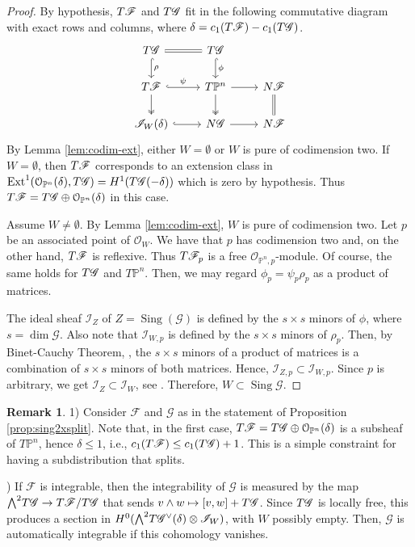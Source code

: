 \documentclass[twoside]{amsart}
\numberwithin{equation}{section}
\newcommand{\opn}{{\mathcal O}_{\mathbb{P}^{n}}}
\newcommand{\pn}{{\mathbb{P}^{n}}}
\newcommand{\tpn}{T{\mathbb{P}^{n}}}
\newcommand{\sI}{\mathscr{I}}
\DeclareMathOperator{\sing}{Sing}
\DeclareMathOperator{\Ext}{Ext}
\def\OO{\mathcal{O}}
\newcommand{\sF}{\mathscr{F}}
\newcommand{\sG}{\mathscr{G}}
\newcommand{\tF}{{\rm T}\sF}
\newcommand{\tG}{{\rm T}\sG}
\newcommand{\nF}{{\rm N}\sF}
\newcommand{\nG}{{\rm N}\sG}
\newcommand{\extp}{{\textstyle \bigwedge}}
\theoremstyle{definition}
\newtheorem{remark}{Remark}[section]
\begin{document}
\begin{proof}
By hypothesis, $\tF$ and $\tG$ fit in the following commutative diagram with exact rows and columns, where $\delta = c_1(\tF) - c_1(\tG)$.
\begin{equation}\label{eq:diagsubfol}
\begin{tikzcd}
 \tG \arrow[r, equal ] \arrow[d, hook, "\rho"] & \tG \arrow[d, hook, "\phi"] & \\
 \tF \arrow[r,hook, "\psi"] \arrow[d,two heads] & \tpn \arrow[d,two heads] \arrow[r] & \nF \arrow[d,equal] \\
 \sI_W(\delta) \arrow[r,hook]  & \nG \arrow[r]  & \nF 
\end{tikzcd}
\end{equation}
By Lemma \ref{lem:codim-ext}, either $W= \emptyset$ or $W$ is pure of codimension two. If $W = \emptyset$, then $\tF$ corresponds to an extension class in $\Ext^1(\opn(\delta) , \tG) = H^1(\tG(-\delta))$ which is zero by hypothesis. Thus $\tF = \tG \oplus \opn(\delta)$ in this case. 

Assume $W \neq \emptyset$. By Lemma \ref{lem:codim-ext}, $W$ is pure of codimension two. Let $p$ be an associated point of $\OO_W$. We have that $p$ has codimension two and, on the other hand, $\tF$ is reflexive. Thus $\tF_p$ is a free $\OO_{\pn,p}$-module. Of course, the same holds for $\tG$ and $\tpn$. Then, we may regard $\phi_p = \psi_p\rho_p$ as a product of matrices. 

The ideal sheaf $\sI_Z$ of $Z= \sing (\sG)$ is defined by the $s\times s$ minors of $\phi$, where $s = \dim \sG$. Also note that $\sI_{W,p}$ is defined by the $s\times s$ minors of $\rho_p$. Then, by Binet-Cauchy Theorem, \cite[p.11]{Gantm.vol1}, the $s\times s$ minors of a product of matrices is a combination of $s\times s$ minors of both matrices. Hence, $\sI_{Z,p} \subset \sI_{W,p}$. Since $p$ is arbitrary, we get $\sI_Z \subset \sI_W$, see \cite[\S6]{Matsumura}. Therefore, $W\subset \sing \sG$.
\end{proof}

\begin{remark}\label{rem:integ-subfol}
1) Consider $\sF$ and $\sG$ as in the statement of Proposition \ref{prop:sing2xsplit}. Note that, in the first case, $\tF = \tG \oplus \opn(\delta)$ is a subsheaf of $\tpn$, hence $\delta \leq 1$, i.e., $c_1(\tF) \leq c_1(\tG)+1$. This is a simple constraint for having a subdistribution that splits. 

) If $\sF$ is integrable, then the integrability of $\sG$ is measured by the map $\extp^2\tG \to \tF/\tG$ that sends $v\wedge w \mapsto [v,w] + \tG$. Since $\tG$ is locally free, this produces a section in $H^0(\extp^2\tG^\vee(\delta)\otimes \sI_W)$, with $W$ possibly empty. Then, $\sG$ is automatically integrable if this cohomology vanishes.  
\end{remark}
\end{document}
